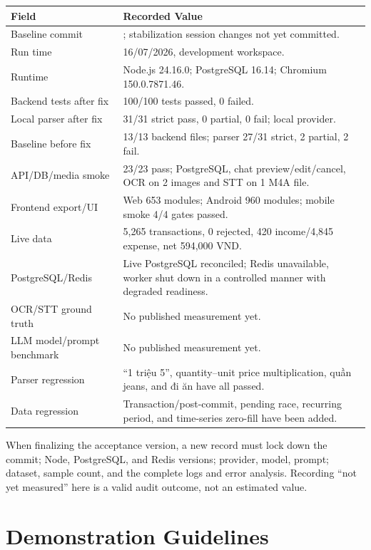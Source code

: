 \begin{longtable}{@{}L{4.0cm}L{10.5cm}@{}}
  \toprule
  \textbf{Field} & \textbf{Recorded Value} \\
  \midrule
  Baseline commit & ; stabilization session changes not yet committed. \\
  Run time & 16/07/2026, development workspace. \\
  Runtime & Node.js 24.16.0; PostgreSQL 16.14; Chromium 150.0.7871.46. \\
  Backend tests after fix & 100/100 tests passed, 0 failed. \\
  Local parser after fix & 31/31 strict pass, 0 partial, 0 fail; local provider. \\
  Baseline before fix & 13/13 backend files; parser 27/31 strict, 2 partial, 2 fail. \\
  API/DB/media smoke & 23/23 pass; PostgreSQL, chat preview/edit/cancel, OCR on 2 images and STT on 1 M4A file. \\
  Frontend export/UI & Web 653 modules; Android 960 modules; mobile smoke 4/4 gates passed. \\
  Live data & 5,265 transactions, 0 rejected, 420 income/4,845 expense, net 594,000 VND. \\
  PostgreSQL/Redis & Live PostgreSQL reconciled; Redis unavailable, worker shut down in a controlled manner with degraded readiness. \\
  OCR/STT ground truth & No published measurement yet. \\
  LLM model/prompt benchmark & No published measurement yet. \\
  Parser regression & ``1 triệu 5'', quantity--unit price multiplication, quần jeans, and đi ăn have all passed. \\
  Data regression & Transaction/post-commit, pending race, recurring period, and time-series zero-fill have been added. \\
  \bottomrule
\end{longtable}

When finalizing the acceptance version, a new record must lock down the commit; Node, PostgreSQL, and Redis versions; provider, model, prompt; dataset, sample count, and the complete logs and error analysis. Recording ``not yet measured'' here is a valid audit outcome, not an estimated value.

\chapter{Demonstration Guidelines}


